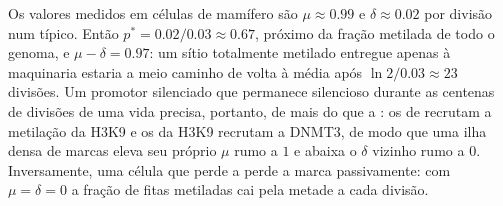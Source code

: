 \begin{example}[Números]\label{ex:b3:chromatin-epigenetics:maintenance-numbers}
Os valores medidos em células de mamífero são $\mu \approx 0.99$ e
$\delta \approx 0.02$ por divisão num  típico. Então $p^{*} =
0.02/0.03 \approx 0.67$, próximo da fração metilada de todo o genoma,
e $\mu - \delta = 0.97$: um sítio totalmente metilado entregue apenas
à maquinaria estaria a meio caminho de volta à média após $\ln 2 /
0.03 \approx 23$ divisões. Um promotor silenciado que permanece
silencioso durante as centenas de divisões de uma vida precisa,
portanto, de mais do que a : os  de  recrutam a
metilação da H3K9 e os  da H3K9 recrutam a DNMT3, de modo que
uma ilha densa de marcas eleva seu próprio $\mu$ rumo a $1$ e abaixa o
$\delta$ vizinho rumo a $0$. Inversamente, uma célula que perde a
 perde a marca passivamente: com $\mu = \delta = 0$ a fração de
fitas metiladas cai pela metade a cada divisão.
\end{example}

